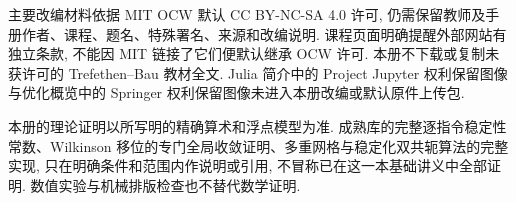 主要改编材料依据 MIT OCW 默认 CC BY-NC-SA 4.0 许可, 仍需保留教师及手册作者、课程、题名、特殊署名、来源和改编说明. 课程页面明确提醒外部网站有独立条款, 不能因 MIT 链接了它们便默认继承 OCW 许可. 本册不下载或复制未获许可的 Trefethen--Bau 教材全文. Julia 简介中的 Project Jupyter 权利保留图像与优化概览中的 Springer 权利保留图像未进入本册改编或默认原件上传包.

本册的理论证明以所写明的精确算术和浮点模型为准. 成熟库的完整逐指令稳定性常数、Wilkinson 移位的专门全局收敛证明、多重网格与稳定化双共轭算法的完整实现, 只在明确条件和范围内作说明或引用, 不冒称已在这一本基础讲义中全部证明. 数值实验与机械排版检查也不替代数学证明.
